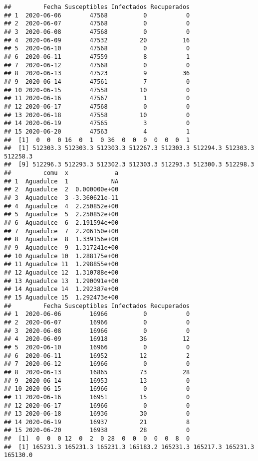 \documentclass[
]{article}
\begin{document}
\begin{verbatim}
##         Fecha Susceptibles Infectados Recuperados
## 1  2020-06-06        47568          0           0
## 2  2020-06-07        47568          0           0
## 3  2020-06-08        47568          0           0
## 4  2020-06-09        47532         20          16
## 5  2020-06-10        47568          0           0
## 6  2020-06-11        47559          8           1
## 7  2020-06-12        47568          0           0
## 8  2020-06-13        47523          9          36
## 9  2020-06-14        47561          7           0
## 10 2020-06-15        47558         10           0
## 11 2020-06-16        47567          1           0
## 12 2020-06-17        47568          0           0
## 13 2020-06-18        47558         10           0
## 14 2020-06-19        47565          3           0
## 15 2020-06-20        47563          4           1
##  [1]  0  0  0 16  0  1  0 36  0  0  0  0  0  0  1
##  [1] 512303.3 512303.3 512303.3 512267.3 512303.3 512294.3 512303.3 512258.3
##  [9] 512296.3 512293.3 512302.3 512303.3 512293.3 512300.3 512298.3
##         comu  x             a
## 1  Aguadulce  1            NA
## 2  Aguadulce  2  0.000000e+00
## 3  Aguadulce  3 -3.360621e-11
## 4  Aguadulce  4  2.250852e+00
## 5  Aguadulce  5  2.250852e+00
## 6  Aguadulce  6  2.191594e+00
## 7  Aguadulce  7  2.206150e+00
## 8  Aguadulce  8  1.339156e+00
## 9  Aguadulce  9  1.317241e+00
## 10 Aguadulce 10  1.288175e+00
## 11 Aguadulce 11  1.298855e+00
## 12 Aguadulce 12  1.310788e+00
## 13 Aguadulce 13  1.290091e+00
## 14 Aguadulce 14  1.292387e+00
## 15 Aguadulce 15  1.292473e+00
##         Fecha Susceptibles Infectados Recuperados
## 1  2020-06-06        16966          0           0
## 2  2020-06-07        16966          0           0
## 3  2020-06-08        16966          0           0
## 4  2020-06-09        16918         36          12
## 5  2020-06-10        16966          0           0
## 6  2020-06-11        16952         12           2
## 7  2020-06-12        16966          0           0
## 8  2020-06-13        16865         73          28
## 9  2020-06-14        16953         13           0
## 10 2020-06-15        16966          0           0
## 11 2020-06-16        16951         15           0
## 12 2020-06-17        16966          0           0
## 13 2020-06-18        16936         30           0
## 14 2020-06-19        16937         21           8
## 15 2020-06-20        16938         28           0
##  [1]  0  0  0 12  0  2  0 28  0  0  0  0  0  8  0
##  [1] 165231.3 165231.3 165231.3 165183.2 165231.3 165217.3 165231.3 165130.0

\end{verbatim}
\end{document}
